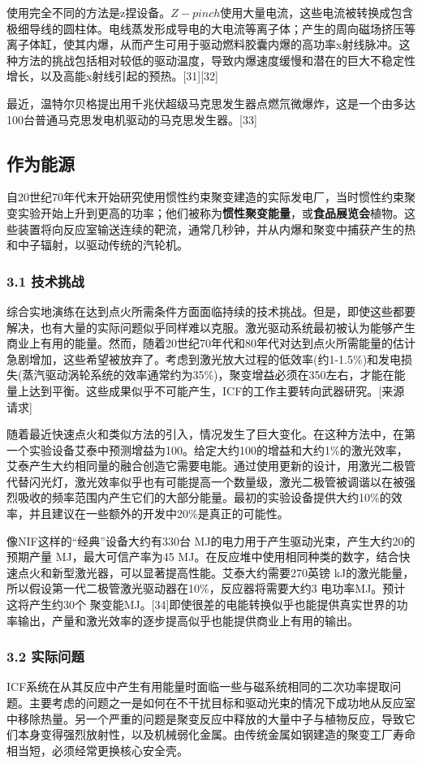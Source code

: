 使用完全不同的方法是z捏设备。$Z-pinch$使用大量电流，这些电流被转换成包含极细导线的圆柱体。电线蒸发形成导电的大电流等离子体；产生的周向磁场挤压等离子体缸，使其内爆，从而产生可用于驱动燃料胶囊内爆的高功率x射线脉冲。这种方法的挑战包括相对较低的驱动温度，导致内爆速度缓慢和潜在的巨大不稳定性增长，以及高能x射线引起的预热。[31][32]

最近，温特尔贝格提出用千兆伏超级马克思发生器点燃氘微爆炸，这是一个由多达100台普通马克思发电机驱动的马克思发生器。[33]

\subsection{作为能源}
自20世纪70年代末开始研究使用惯性约束聚变建造的实际发电厂，当时惯性约束聚变实验开始上升到更高的功率；他们被称为\textbf{惯性聚变能量}，或\textbf{食品展览会}植物。这些装置将向反应室输送连续的靶流，通常几秒钟，并从内爆和聚变中捕获产生的热和中子辐射，以驱动传统的汽轮机。
\subsubsection{3.1 技术挑战}
综合实地演练在达到点火所需条件方面面临持续的技术挑战。但是，即使这些都要解决，也有大量的实际问题似乎同样难以克服。激光驱动系统最初被认为能够产生商业上有用的能量。然而，随着20世纪70年代和80年代对达到点火所需能量的估计急剧增加，这些希望被放弃了。考虑到激光放大过程的低效率(约1-1.5\%)和发电损失(蒸汽驱动涡轮系统的效率通常约为35\%)，聚变增益必须在350左右，才能在能量上达到平衡。这些成果似乎不可能产生，ICF的工作主要转向武器研究。[来源请求]

随着最近快速点火和类似方法的引入，情况发生了巨大变化。在这种方法中，在第一个实验设备艾泰中预测增益为100。给定大约100的增益和大约1\%的激光效率，艾泰产生大约相同量的融合创造它需要电能。通过使用更新的设计，用激光二极管代替闪光灯，激光效率似乎也有可能提高一个数量级，激光二极管被调谐以在被强烈吸收的频率范围内产生它们的大部分能量。最初的实验设备提供大约10\%的效率，并且建议在一些额外的开发中20\%是真正的可能性。

像NIF这样的“经典”设备大约有330台 MJ的电力用于产生驱动光束，产生大约20的预期产量 MJ，最大可信产率为45 MJ。在反应堆中使用相同种类的数字，结合快速点火和新型激光器，可以显著提高性能。艾泰大约需要270英镑 kJ的激光能量，所以假设第一代二极管激光驱动器在10\%，反应器将需要大约3 电功率MJ。预计这将产生约30个 聚变能MJ。[34]即使很差的电能转换似乎也能提供真实世界的功率输出，产量和激光效率的逐步提高似乎也能提供商业上有用的输出。
\subsubsection{3.2 实际问题}
ICF系统在从其反应中产生有用能量时面临一些与磁系统相同的二次功率提取问题。主要考虑的问题之一是如何在不干扰目标和驱动光束的情况下成功地从反应室中移除热量。另一个严重的问题是聚变反应中释放的大量中子与植物反应，导致它们本身变得强烈放射性，以及机械弱化金属。由传统金属如钢建造的聚变工厂寿命相当短，必须经常更换核心安全壳。

